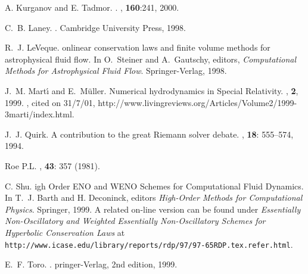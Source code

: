 \documentclass{article}
\begin{document}
\begin{thebibliography}{20}
A. Kurganov and E. Tadmor.
.
, {\bf 160}:241, 2000.

C.~B. Laney.
.
\newblock Cambridge University Press, 1998.

R.~J. LeVeque.
onlinear conservation laws and finite volume methods for
  astrophysical fluid flow.
\newblock In O.~Steiner and A.~Gautschy, editors, {\em {C}omputational
  {M}ethods for {A}strophysical {F}luid {F}low}. Springer-Verlag, 1998.

J.~M. Mart{\'{\i}} and E.~M{\"u}ller.
\newblock Numerical hydrodynamics in {S}pecial {R}elativity.
, {\bf 2}, 1999.
, cited on 31/7/01,
  http://www.livingreviews.org/Articles/Volume2/1999-3marti/index.html.

J.~J. Quirk.
\newblock A contribution to the great {R}iemann solver debate.
, {\bf 18}: 555--574,
  1994.

Roe P.L.
, {\bf 43}: 357 (1981).

C. Shu.
igh {O}rder {ENO} and {WENO} {S}chemes for
{C}omputational {F}luid {D}ynamics.
\newblock In T.~J. Barth and H. Deconinck, editors {\em High-Order
  Methods for Computational Physics}. Springer, 1999.
\newblock A related on-line version can be found under {\em Essentially
  {N}on-{O}scillatory and {W}eighted {E}ssentially {N}on-{O}scillatory
  {S}chemes for {H}yperbolic {C}onservation {L}aws} at {\tt
  http://www.icase.edu/library/reports/rdp/97/97-65RDP.tex.refer.html}. 

E.~F. Toro.
.
pringer-{V}erlag, 2nd edition, 1999.

\end{thebibliography}

\end{document}
